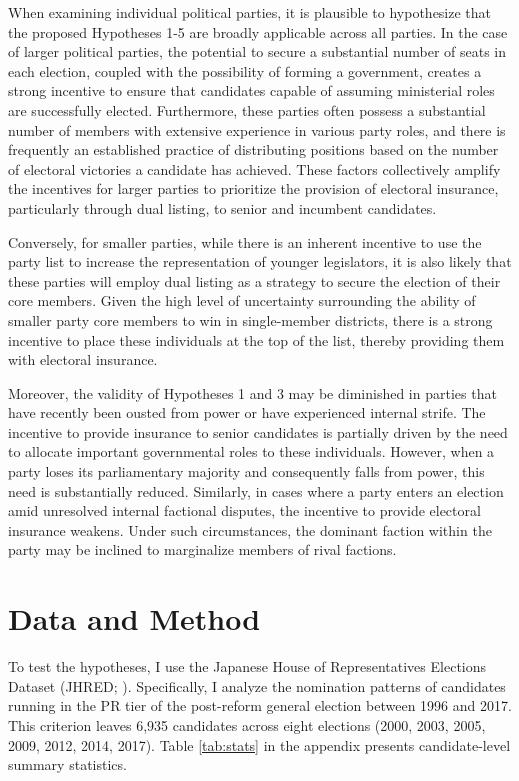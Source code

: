 \documentclass[a4paper, 11pt]{article}
\begin{document}
When examining individual political parties, it is plausible to hypothesize that the proposed Hypotheses 1-5 are broadly applicable across all parties. In the case of larger political parties, the potential to secure a substantial number of seats in each election, coupled with the possibility of forming a government, creates a strong incentive to ensure that candidates capable of assuming ministerial roles are successfully elected. Furthermore, these parties often possess a substantial number of members with extensive experience in various party roles, and there is frequently an established practice of distributing positions based on the number of electoral victories a candidate has achieved. These factors collectively amplify the incentives for larger parties to prioritize the provision of electoral insurance, particularly through dual listing, to senior and incumbent candidates.

Conversely, for smaller parties, while there is an inherent incentive to use the party list to increase the representation of younger legislators, it is also likely that these parties will employ dual listing as a strategy to secure the election of their core members. Given the high level of uncertainty surrounding the ability of smaller party core members to win in single-member districts, there is a strong incentive to place these individuals at the top of the list, thereby providing them with electoral insurance.

Moreover, the validity of Hypotheses 1 and 3 may be diminished in parties that have recently been ousted from power or have experienced internal strife. The incentive to provide insurance to senior candidates is partially driven by the need to allocate important governmental roles to these individuals. However, when a party loses its parliamentary majority and consequently falls from power, this need is substantially reduced. Similarly, in cases where a party enters an election amid unresolved internal factional disputes, the incentive to provide electoral insurance weakens. Under such circumstances, the dominant faction within the party may be inclined to marginalize members of rival factions.


\section{Data and Method} \label{sec: emp}

To test the hypotheses, I use the Japanese House of Representatives Elections Dataset (JHRED; \citet{reedsmith2018}). Specifically, I analyze the nomination patterns of candidates running in the PR tier of the post-reform general election between 1996 and 2017. This criterion leaves 6,935 candidates across eight elections (2000, 2003, 2005, 2009, 2012, 2014, 2017). Table \ref{tab:stats} in the appendix presents candidate-level summary statistics. 
\end{document}
